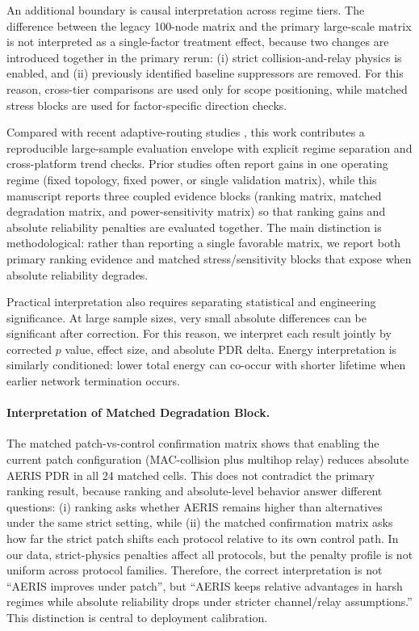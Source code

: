 ﻿\documentclass[sensors,article,submit,moreauthors,pdftex]{Definitions/mdpi}
\begin{document}
An additional boundary is causal interpretation across regime tiers. The difference between the legacy 100-node matrix and the primary large-scale matrix is not interpreted as a single-factor treatment effect, because two changes are introduced together in the primary rerun: (i) strict collision-and-relay physics is enabled, and (ii) previously identified baseline suppressors are removed. For this reason, cross-tier comparisons are used only for scope positioning, while matched stress blocks are used for factor-specific direction checks.

Compared with recent adaptive-routing studies \cite{Ren2024,Okine2024,Naeem2024DRL,Scientific2025DRLGNN,Kaddi2024GWOCSMA,Wang2024Geographic,Tariq2024A,Jain2025Optimized,Ti2026HEOCP,Manogaran2025DDQN}, this work contributes a reproducible large-sample evaluation envelope with explicit regime separation and cross-platform trend checks. Prior studies often report gains in one operating regime (fixed topology, fixed power, or single validation matrix), while this manuscript reports three coupled evidence blocks (ranking matrix, matched degradation matrix, and power-sensitivity matrix) so that ranking gains and absolute reliability penalties are evaluated together. The main distinction is methodological: rather than reporting a single favorable matrix, we report both primary ranking evidence and matched stress/sensitivity blocks that expose when absolute reliability degrades.

Practical interpretation also requires separating statistical and engineering significance. At large sample sizes, very small absolute differences can be significant after correction. For this reason, we interpret each result jointly by corrected $p$ value, effect size, and absolute PDR delta. Energy interpretation is similarly conditioned: lower total energy can co-occur with shorter lifetime when earlier network termination occurs.

\paragraph{Interpretation of Matched Degradation Block.}
The matched patch-vs-control confirmation matrix shows that enabling the current patch configuration (MAC-collision plus multihop relay) reduces absolute AERIS PDR in all 24 matched cells. This does not contradict the primary ranking result, because ranking and absolute-level behavior answer different questions: (i) ranking asks whether AERIS remains higher than alternatives under the same strict setting, while (ii) the matched confirmation matrix asks how far the strict patch shifts each protocol relative to its own control path. In our data, strict-physics penalties affect all protocols, but the penalty profile is not uniform across protocol families. Therefore, the correct interpretation is not ``AERIS improves under patch'', but ``AERIS keeps relative advantages in harsh regimes while absolute reliability drops under stricter channel/relay assumptions.'' This distinction is central to deployment calibration.
\end{document}
